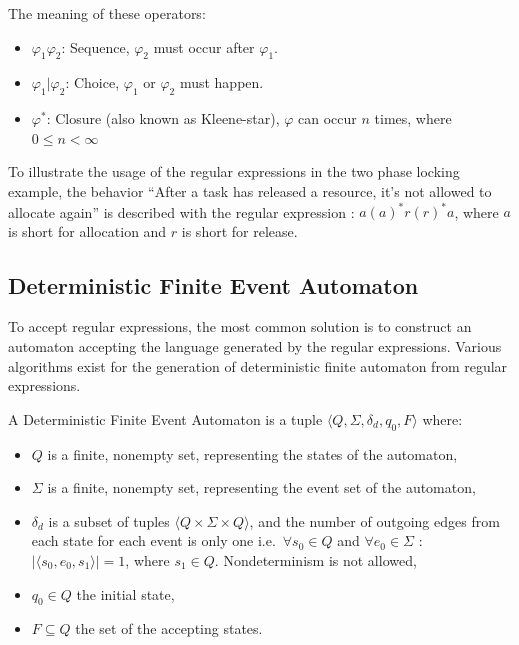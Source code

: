 		The meaning of these operators:
		\begin{itemize}
			\item $\varphi_1 \varphi_2$: Sequence, $\varphi_2$ must occur after $\varphi_1$.
			\item $\varphi_1 | \varphi_2$: Choice, $\varphi_1$ or $\varphi_2$ must happen.
			\item $\varphi^\ast$: Closure (also known as Kleene-star), $\varphi$ can occur $n$ times, where $0 \leq n < \infty$
		\end{itemize}
		

		To illustrate the usage of the regular expressions in the two phase locking example, the behavior ``After a task has released a resource, it's not allowed to allocate again'' is described with the regular expression : $a (a)^* r (r)^* a $, where $a$ is short for allocation and $r$ is short for release.


	\subsection{Deterministic Finite Event Automaton}
		To accept regular expressions, the most common solution is to construct an automaton accepting the language generated by the regular expressions. Various  algorithms exist for the generation of deterministic finite automaton from regular expressions. 
		
		\begin{dfn}
			\label{dfn:cep:ea}
			A Deterministic Finite Event Automaton is a tuple $\langle Q,\Sigma,\delta_d,q_0, F \rangle$\citep{lam2006compilers} where: 
				\begin{itemize}
					\item $Q$ is a finite, nonempty set, representing the states of the automaton,
					\item $\Sigma$ is a finite, nonempty set, representing the event set of the automaton,
					\item $\delta_d$ is a subset of tuples $\langle Q \times \Sigma \times Q \rangle$,
						and the number of outgoing edges from each state for each event is only one 
						i.e.~$\forall s_0 \in Q$ and $\forall e_0 \in \Sigma$ : $|\langle s_0, e_0, s_1 \rangle| = 1$, where $s_1 \in Q$. Nondeterminism is not allowed,
					\item $q_0 \in Q$ the initial state,
					\item $F \subseteq Q$ the set of the accepting states.
				\end{itemize}	
		\end{dfn}
	

